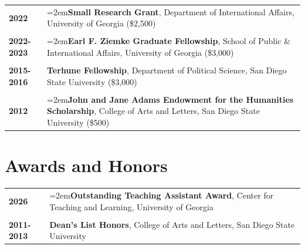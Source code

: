 \documentclass[letterpaper,12pt]{article}
\begin{document}
\begin{xltabular}{\dimexpr\textwidth-0in}{p{1.5in}X}
\textbf{2022}         		& \hangindent=2em\textbf{Small Research Grant}, Department of International Affairs, University of \mbox{Georgia} (\$2,500)\\ \\

\textbf{2022-2023} 		& \hangindent=2em\textbf{Earl F. Ziemke Graduate Fellowship}, School of Public \& International Affairs, \mbox{University} of Georgia (\$3,000)\\ \\
                              
\textbf{2015-2016} 		& \textbf{Terhune Fellowship}, Department of Political Science, San Diego State University (\$3,000)\\ \\

\textbf{2012}          		& \hangindent=2em\textbf{John and Jane Adams Endowment for the Humanities Scholarship}, \mbox{College} of Arts and Letters, San Diego State University (\$500)
\end{xltabular}

\section{Awards and Honors}

\begin{xltabular}{\dimexpr\textwidth-0in}{p{1.5in}X}
\textbf{2026}          		& \hangindent=2em\textbf{Outstanding Teaching Assistant Award}, Center for Teaching and Learning, University of Georgia\\ \\

\textbf{2011-2013} 		& \textbf{Dean's List Honors}, College of Arts and Letters, San Diego State University
\end{xltabular}

\end{document}
